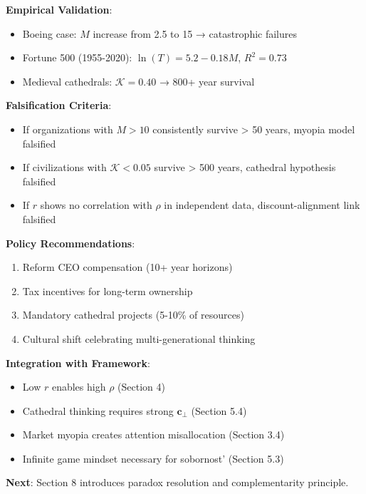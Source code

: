 \documentclass[11pt,a4paper]{article}
\theoremstyle{definition}
\theoremstyle{remark}
\newcommand{\cc}{\mathbf{c}}
\begin{document}
\begin{enumerate}
\begin{mdframed}[backgroundcolor=green!10,linewidth=2pt,linecolor=green!70!black]
\textbf{Empirical Validation}:
\begin{itemize}[nosep]
    \item Boeing case: \(M\) increase from 2.5 to 15 → catastrophic failures
    \item Fortune 500 (1955-2020): \(\ln(T) = 5.2 - 0.18M\), \(R^2 = 0.73\)
    \item Medieval cathedrals: \(\mathcal{K} = 0.40\) → 800+ year survival
\end{itemize}

\textbf{Falsification Criteria}:
\begin{itemize}[nosep]
    \item If organizations with \(M > 10\) consistently survive > 50 years, myopia model falsified
    \item If civilizations with \(\mathcal{K} < 0.05\) survive > 500 years, cathedral hypothesis falsified
    \item If \(r\) shows no correlation with \(\rho\) in independent data, discount-alignment link falsified
\end{itemize}

\textbf{Policy Recommendations}:
\begin{enumerate}[nosep]
    \item Reform CEO compensation (10+ year horizons)
    \item Tax incentives for long-term ownership
    \item Mandatory cathedral projects (5-10\% of resources)
    \item Cultural shift celebrating multi-generational thinking
\end{enumerate}

\textbf{Integration with Framework}:
\begin{itemize}[nosep]
    \item Low \(r\) enables high \(\rho\) (Section 4)
    \item Cathedral thinking requires strong \(\cc_\perp\) (Section 5.4)
    \item Market myopia creates attention misallocation (Section 3.4)
    \item Infinite game mindset necessary for sobornost' (Section 5.3)
\end{itemize}

\textbf{Next}: Section 8 introduces paradox resolution and complementarity principle.
\end{mdframed}

\begin{figure}[H]
\centering
{}
\end{figure}
\end{enumerate}
\end{document}

